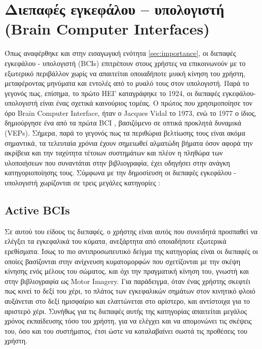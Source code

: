\documentclass[11pt,a4paper,english,greek,twoside]{../Thesis}
\begin{document}
\section{Διεπαφές εγκεφάλου – υπολογιστή (Brain Computer Interfaces)}

  \par Όπως αναφέρθηκε και στην εισαγωγική ενότητα \ref{sec:importance}, οι διεπαφές εγκεφάλου - υπολογιστή (BCIs) επιτρέπουν στους χρήστες να επικοινωνούν με το εξωτερικό περιβάλλον χωρίς να απαιτείται οποιαδήποτε μυική κίνηση του χρήστη, μεταφέροντας μηνύματα και εντολές από το μυαλό τους στον υπολογιστή. Παρά το γεγονός πως, επίσημα, το πρώτο ΗΕΓ καταγράφηκε το 1924, οι διεπαφές εγκεφάλου-υπολογιστή είναι ένας σχετικά καινούριος τομέας. Ο πρώτος που χρησιμοποίησε τον όρο Brain Computer Interface, ήταν ο Jacques Vidal \cite{Vidal1973-xi} το 1973, ενώ το 1977 ο ίδιος, δημιούργησε ένα από τα πρώτα BCI \cite{Vidal1977-wi}, βασιζόμενο σε οπτικά προκλητά δυναμικά (VEPs). Σήμερα, παρά το γεγονός πως τα περιθώρια βελτίωσης τους είναι ακόμα σημαντικά, τα τελευταία χρόνια έχουν σημειωθεί αλματώδη βήματα όσον αφορά την ακρίβεια και την ταχύτητα τέτοιων συστημάτων και πλέον η πληθώρα των υλοποιήσεων που συναντάται στην βιβλιογραφία, έχει οδηγήσει στην ανάγκη κατηγοριοποίησης τους. Σύμφωνα με την δημοσίευση \cite{Zander2010-ji} οι διεπαφές εγκεφάλου - υπολογιστή χωρίζονται σε τρεις μεγάλες κατηγορίες : 
  \label{sec:bci_categories}
  \subsection{Active BCIs}
  \par Σε αυτού του είδους τις διεπαφές, ο χρήστης είναι αυτός που συνειδητά προσπαθεί να ελέγξει τα εγκεφαλικά του κύματα, ανεξάρτητα από οποιαδήποτε εξωτερικά ερεθίσματα. Ίσως το πιο αντιπροσωπευτικό δείγμα της κατηγορίας είναι οι διεπαφές οι οποίες βασίζονται στην ανίχνευση κυματομορφών που σχετίζονται με την σκέψη κίνησης ενός μέλους του σώματος, και όχι την πραγματική κίνηση του, γνωστή και στην βιβλιογραφία ως Motor Imagery. Για παράδειγμα, όταν ένας χρήστης σκεφτέι πως κινεί το δεξί του χέρι, το πλάτος των εγκεφαλικών σημάτων στον κινητικό φλοιό αυξάνεται στο δεξί ημισφαίριο και ελαττώνεται στο αρίστερο, και αντίστοιχα για το αριστερό χέρι. Συνήθως για τις διεπαφές αυτής της κατηγορίας απαιτείται μεγάλος χρόνος εκπαίδευσης τόσο του χρήστη, για να ελέγχει και να απομονώνει τις σκέψεις του, όσο και του συστήματος, έτσι ώστε να καταλαβαίνει σωστά τις προθέσεις του χρήστη. 
\end{document}
